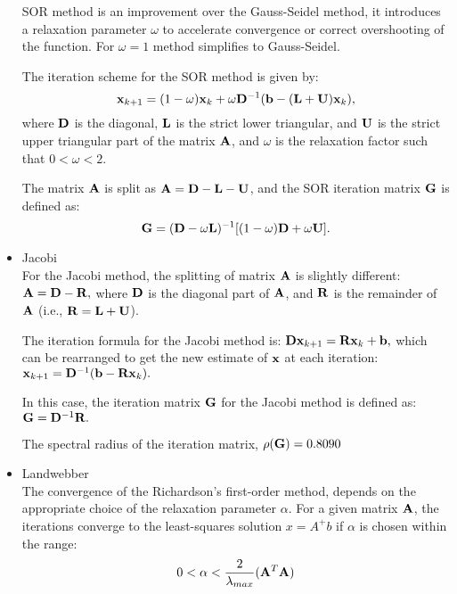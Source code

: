 \begin{itemize}
    SOR method is an improvement over the Gauss-Seidel method, it introduces a relaxation parameter $ \omega $ to accelerate convergence or correct overshooting of the function.
    For $\omega = 1$ method simplifies to Gauss-Seidel.

    The iteration scheme for the SOR method is given by:
    $$ \mathbf{x}_{k+1} = (1-\omega)\mathbf{x}_k + \omega \mathbf{D}^{-1}(\mathbf{b} - (\mathbf{L} + \mathbf{U})\mathbf{x}_k), $$
    where $ \mathbf{D} $ is the diagonal, $ \mathbf{L} $ is the strict lower triangular, and $ \mathbf{U} $ is the strict upper triangular part of the matrix $ \mathbf{A} $, and $ \omega $ is the relaxation factor such that $ 0 < \omega < 2 $.

    The matrix $ \mathbf{A} $ is split as $ \mathbf{A} = \mathbf{D} - \mathbf{L} - \mathbf{U} $, and the SOR iteration matrix $ \mathbf{G}$ is defined as:
    $$ \mathbf{G}  = (\mathbf{D} - \omega \mathbf{L})^{-1}[(1-\omega)\mathbf{D} + \omega \mathbf{U}]. $$

  \item Jacobi \\
  
    For the Jacobi method, the splitting of matrix $ \mathbf{A} $ is slightly different:
    $ \mathbf{A} = \mathbf{D} - \mathbf{R}, $
    where $ \mathbf{D} $ is the diagonal part of $ \mathbf{A} $, and $ \mathbf{R} $ is the remainder of $ \mathbf{A} $ (i.e., $ \mathbf{R} = \mathbf{L} + \mathbf{U} $).

    The iteration formula for the Jacobi method is:
    $ \mathbf{Dx}_{k+1} = \mathbf{Rx}_k + \mathbf{b}, $
    which can be rearranged to get the new estimate of $ \mathbf{x} $ at each iteration:
    $ \mathbf{x}_{k+1} = \mathbf{D}^{-1}(\mathbf{b} - \mathbf{Rx}_k). $

    In this case, the iteration matrix $ \mathbf{G} $ for the Jacobi method is defined as:
    $ \mathbf{G} = \mathbf{D}^{-1}\mathbf{R}. $

    The spectral radius of the iteration matrix, $ \rho(\mathbf{G}) = 0.8090$

  \item Landwebber \\
  
  The convergence of the Richardson's first-order method, depends on the appropriate choice of the relaxation parameter \( \alpha \). 
  For a given matrix $\mathbf{A}$, the iterations converge to the least-squares solution \( x = A^+b \) if \( \alpha \) is chosen within the range:
  \begin{equation*}
    0 < \alpha < \frac{2}{\lambda_{max}}(\mathbf{A}^T\mathbf{A}) 
  \end{equation*}


\end{itemize}
